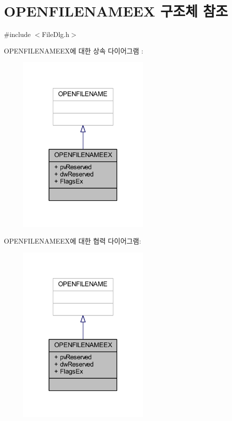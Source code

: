 \hypertarget{struct_o_p_e_n_f_i_l_e_n_a_m_e_e_x}{}\section{O\+P\+E\+N\+F\+I\+L\+E\+N\+A\+M\+E\+EX 구조체 참조}
\label{struct_o_p_e_n_f_i_l_e_n_a_m_e_e_x}


{\ttfamily \#include $<$File\+Dlg.\+h$>$}



O\+P\+E\+N\+F\+I\+L\+E\+N\+A\+M\+E\+E\+X에 대한 상속 다이어그램 \+: \nopagebreak
\begin{figure}[H]
\begin{center}
\leavevmode
\includegraphics[width=185pt]{struct_o_p_e_n_f_i_l_e_n_a_m_e_e_x__inherit__graph}
\end{center}
\end{figure}


O\+P\+E\+N\+F\+I\+L\+E\+N\+A\+M\+E\+E\+X에 대한 협력 다이어그램\+:\nopagebreak
\begin{figure}[H]
\begin{center}
\leavevmode
\includegraphics[width=185pt]{struct_o_p_e_n_f_i_l_e_n_a_m_e_e_x__coll__graph}
\end{center}
\end{figure}
